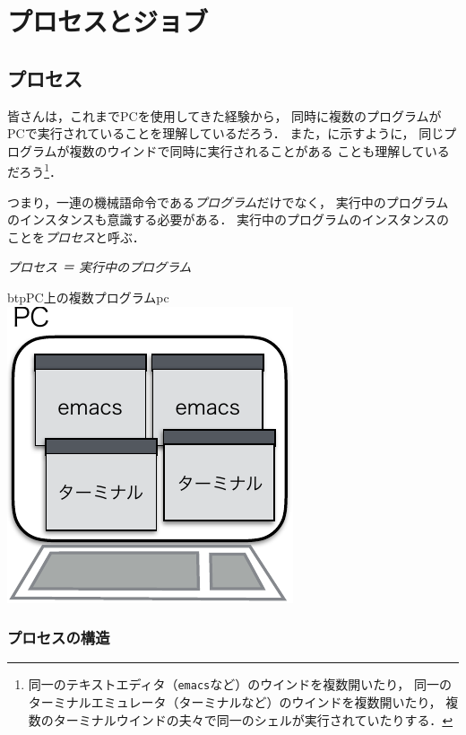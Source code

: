\chapter{プロセスとジョブ}

\section{プロセス}
皆さんは，これまでPCを使用してきた経験から，
同時に複数のプログラムがPCで実行されていることを理解しているだろう．
また，に示すように，
同じプログラムが複数のウインドで同時に実行されることがある
ことも理解しているだろう\footnote{
同一のテキストエディタ（\texttt{emacs}など）のウインドを複数開いたり，
同一のターミナルエミュレータ（ターミナルなど）のウインドを複数開いたり，
複数のターミナルウインドの夫々で同一のシェルが実行されていたりする．
}．

つまり，一連の機械語命令である\emph{プログラム}だけでなく，
実行中のプログラムのインスタンスも意識する必要がある．
実行中のプログラムのインスタンスのことを\emph{プロセス}と呼ぶ．

\begin{center}
  \emph{\Large プロセス ＝ 実行中のプログラム}
\end{center}

\begin{myfig}{btp}{PC上の複数プログラム}{pc}
  \includegraphics[scale=0.9]{Fig/pc-crop.pdf}
\end{myfig}

\subsection{プロセスの構造}


